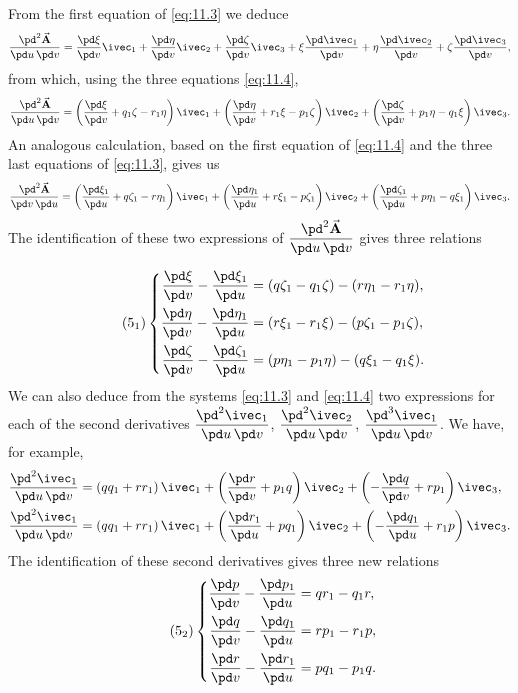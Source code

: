 From the first equation of \eqref{eq:11.3} we deduce
\[
\frac{\pd^{2}\vec{\mathbf{A}}}{\pd u\,\pd v}=
\frac{\pd\xi}{\pd v}\ivec_{1}+
\frac{\pd\eta}{\pd v}\ivec_{2}+
\frac{\pd\zeta}{\pd v}\ivec_{3}+
\xi\frac{\pd\ivec_{1}}{\pd v}+
\eta\frac{\pd\ivec_{2}}{\pd v}+
\zeta\frac{\pd\ivec_{3}}{\pd v},
\]
from which, using the three equations \eqref{eq:11.4},
\[
\frac{\pd^{2}\vec{\mathbf{A}}}{\pd u\,\pd v}=
\left(\frac{\pd\xi}{\pd v}+q_{1}\zeta-r_{1}\eta\right)\ivec_{1}+
\left(\frac{\pd\eta}{\pd v}+r_{1}\xi-p_{1}\zeta\right)\ivec_{2}+
\left(\frac{\pd\zeta}{\pd v}+p_{1}\eta-q_{1}\xi\right)\ivec_{3}.
\]
An analogous calculation, based on the first equation of \eqref{eq:11.4} and the three last equations of \eqref{eq:11.3}, gives us
\[
\frac{\pd^{2}\vec{\mathbf{A}}}{\pd v\,\pd u}=
\left(\frac{\pd\xi_{1}}{\pd u}+q\zeta_{1}-r\eta_{1}\right)\ivec_{1}+
\left(\frac{\pd\eta_{1}}{\pd u}+r\xi_{1}-p\zeta_{1}\right)\ivec_{2}+
\left(\frac{\pd\zeta_{1}}{\pd u}+p\eta_{1}-q\xi_{1}\right)\ivec_{3}.
\]
The identification of these two expressions of $\dfrac{\pd^{2}\vec{\mathbf{A}}}{\pd u\,\pd v}$ gives three relations
\addtocounter{equation}{1}
\begin{equation}
  \label{eq:11.5-1}\tag{$5_{1}$}
  \left\{
    \begin{aligned}
      \frac{\pd\xi}{\pd v}-\frac{\pd\xi_{1}}{\pd u}&=(q\zeta_{1}-q_{1}\zeta)-(r\eta_{1}-r_{1}\eta),\\
      \frac{\pd\eta}{\pd v}-\frac{\pd\eta_{1}}{\pd u}&=(r\xi_{1}-r_{1}\xi)-(p\zeta_{1}-p_{1}\zeta),\\
      \frac{\pd\zeta}{\pd v}-\frac{\pd\zeta_{1}}{\pd u}&=(p\eta_{1}-p_{1}\eta)-(q\xi_{1}-q_{1}\xi).
    \end{aligned}
  \right.
\end{equation}
We can also deduce from the systems \eqref{eq:11.3} and \eqref{eq:11.4} two expressions for each of the second derivatives $\dfrac{\pd^{2}\ivec_{1}}{\pd u\,\pd v}$, $\dfrac{\pd^{2}\ivec_{2}}{\pd u\,\pd v}$, $\dfrac{\pd^{3}\ivec_{1}}{\pd u\,\pd v}$. We have, for example,
\begin{align*}
\frac{\pd^{2}\ivec_{1}}{\pd u\,\pd v}&=
\left(qq_{1}+rr_{1}\right)\ivec_{1}+
\left(\frac{\pd r}{\pd v}+p_{1}q\right)\ivec_{2}+
\left(-\frac{\pd q}{\pd v}+rp_{1}\right)\ivec_{3},\\
\frac{\pd^{2}\ivec_{1}}{\pd u\,\pd v}&=
\left(qq_{1}+rr_{1}\right)\ivec_{1}+
\left(\frac{\pd r_{1}}{\pd u}+pq_{1}\right)\ivec_{2}+
\left(-\frac{\pd q_{1}}{\pd u}+r_{1}p\right)\ivec_{3}.
\end{align*}
The identification of these second derivatives gives three new relations
\begin{equation}
  \label{eq:11.5-2}\tag{$5_{2}$}
  \left\{
    \begin{aligned}
      \frac{\pd p}{\pd v}-\frac{\pd p_{1}}{\pd u}&=qr_{1}-q_{1}r,\\
      \frac{\pd q}{\pd v}-\frac{\pd q_{1}}{\pd u}&=rp_{1}-r_{1}p,\\
      \frac{\pd r}{\pd v}-\frac{\pd r_{1}}{\pd u}&=pq_{1}-p_{1}q.
    \end{aligned}
  \right.
\end{equation}

